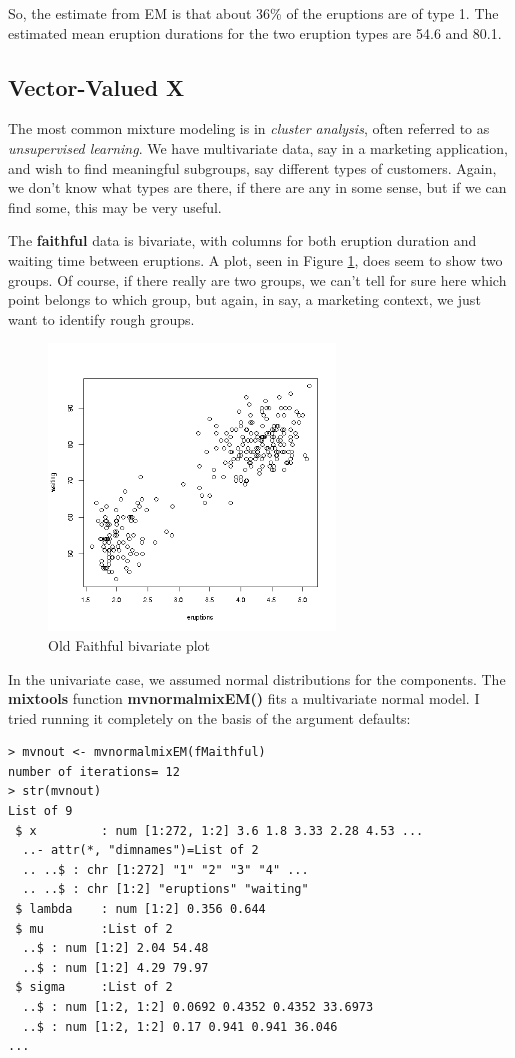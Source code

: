 \documentclass[11pt]{article}
\begin{document}
So, the estimate from EM is that about 36\% of the eruptions are of type
1.  The estimated mean eruption durations for the two eruption types
are 54.6 and 80.1.

\subsection{Vector-Valued X}

The most common mixture modeling is in \textit{cluster analysis}, often
referred to as \textit{unsupervised learning}.  We have multivariate
data, say in a marketing application, and wish to find meaningful
subgroups, say different types of customers.  Again, we don't know what
types are there, if there are any in some sense, but if we can find
some, this may be very useful.

The \textbf{faithful} data is bivariate, with columns for both eruption
duration and waiting time between eruptions.  A plot, seen in Figure
\ref{bivariatefaithful}, does seem to show two groups.  Of course, if
there really are two groups, we can't tell for sure here which point
belongs to which group, but again, in say, a marketing context, we just
want to identify rough groups.  

\begin{figure}[tb]
\centerline{
\includegraphics[width=3.0in]{BivarFaithful.png}
}
\caption{Old Faithful bivariate plot}
\label{bivariatefaithful}
\end{figure}

In the univariate case, we assumed normal distributions for the
components.  The \textbf{mixtools} function \textbf{mvnormalmixEM()} 
fits a multivariate normal model.  I tried running it completely on the
basis of the argument defaults:

\begin{lstlisting}
> mvnout <- mvnormalmixEM(fMaithful)
number of iterations= 12 
> str(mvnout)
List of 9
 $ x         : num [1:272, 1:2] 3.6 1.8 3.33 2.28 4.53 ...
  ..- attr(*, "dimnames")=List of 2
  .. ..$ : chr [1:272] "1" "2" "3" "4" ...
  .. ..$ : chr [1:2] "eruptions" "waiting"
 $ lambda    : num [1:2] 0.356 0.644
 $ mu        :List of 2
  ..$ : num [1:2] 2.04 54.48
  ..$ : num [1:2] 4.29 79.97
 $ sigma     :List of 2
  ..$ : num [1:2, 1:2] 0.0692 0.4352 0.4352 33.6973
  ..$ : num [1:2, 1:2] 0.17 0.941 0.941 36.046
...
\end{lstlisting}
\end{document}
